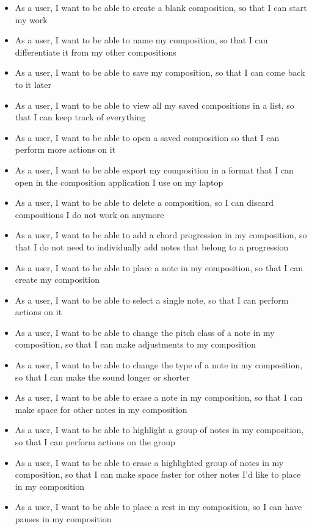   \begin{itemize}
    \item As a user, I want to be able to create a blank composition, so that I can start my work
    \item As a user, I want to be able to name my composition, so that I can differentiate it from my other compositions
    \item As a user, I want to be able to save my composition, so that I can come back to it later
    \item As a user, I want to be able to view all my saved compositions in a list, so that I can keep track of everything
    \item As a user, I want to be able to open a saved composition so that I can perform more actions on it
    \item As a user, I want to be able export my composition in a format that I can open in the composition application I use on my laptop
    \item As a user, I want to be able to delete a composition, so I can discard compositions I do not work on anymore
    \item As a user, I want to be able to add a chord progression in my composition, so that I do not need to individually add notes that belong to a progression
    \item As a user, I want to be able to place a note in my composition, so that I can create my composition
    \item As a user, I want to be able to select a single note, so that I can perform actions on it
    \item As a user, I want to be able to change the pitch class of a note in my composition, so that I can make adjustments to my composition
    \item As a user, I want to be able to change the type of a note in my composition, so that I can make the sound longer or shorter
    \item As a user, I want to be able to erase a note in my composition, so that I can make space for other notes in my composition
    \item As a user, I want to be able to highlight a group of notes in my composition, so that I can perform actions on the group
    \item As a user, I want to be able to erase a highlighted group of notes in my composition, so that I can make space faster for other notes I'd like to place in my composition
    \item As a user, I want to be able to place a rest in my composition, so I can have pauses in my composition

\end{itemize}
